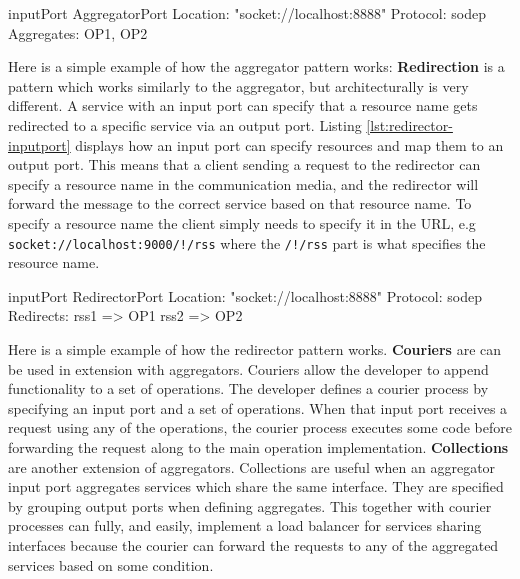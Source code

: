 \begin{jolisting}[][caption={Input port which aggregates requests to some output ports, OP1 and OP2.}, label=lst:aggregator-inputport]
inputPort AggregatorPort {
    Location: "socket://localhost:8888"
    Protocol: sodep
    Aggregates: OP1, OP2
}
\end{jolisting}

Here is a simple example of how the aggregator pattern works: 
\newline\newline
\textbf{Redirection} is a pattern which works similarly to the aggregator, but architecturally is very different.
A service with an input port can specify that a resource name gets redirected to a specific service via an output port.
Listing \ref*{lst:redirector-inputport} displays how an input port can specify resources and map them to an output port.
This means that a client sending a request to the redirector can specify a resource name in the communication media, and the redirector will forward the message to the correct service based on that resource name.
To specify a resource name the client simply needs to specify it in the URL, e.g \texttt{socket://localhost:9000/!/rss} where the \texttt{/!/rss} part is what specifies the resource name.

\begin{jolisting}[][caption={Input port which redirects requests using resource names}, label=lst:redirector-inputport]
inputPort RedirectorPort {
    Location: "socket://localhost:8888"
    Protocol: sodep
    Redirects:
        rss1 => OP1
        rss2 => OP2
}
\end{jolisting}

Here is a simple example of how the redirector pattern works.
\newline\newline
\textbf{Couriers} are can be used in extension with aggregators. Couriers allow the developer to append functionality to a set of operations.
The developer defines a courier process by specifying an input port and a set of operations. When that input port receives a request using any of the operations, the courier process executes some code before forwarding
the request along to the main operation implementation.
\newline\newline
\textbf{Collections} are another extension of aggregators. Collections are useful when an aggregator input port aggregates services which share the same interface.
They are specified by grouping output ports when defining aggregates.
This together with courier processes can fully, and easily, implement a load balancer for services sharing interfaces because the courier can forward the requests to any of the aggregated services based on some condition.


